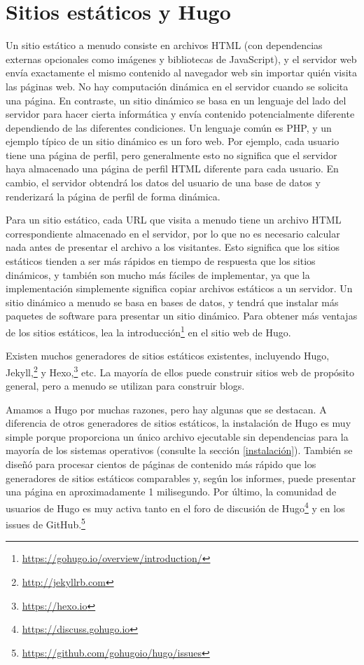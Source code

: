 \documentclass[12pt,]{krantz}
\renewcommand{\href}[2]{#2\footnote{\url{#1}}}
\theoremstyle{definition}
\theoremstyle{definition}
\theoremstyle{definition}
\theoremstyle{remark}
\begin{document}
\hypertarget{static-sites}{%
\section{Sitios estáticos y Hugo}\label{static-sites}}

Un sitio estático a menudo consiste en archivos
HTML (con dependencias externas opcionales como imágenes y bibliotecas
de JavaScript), y el servidor web envía exactamente el mismo contenido
al navegador web sin importar quién visita las páginas web. No hay
computación dinámica en el servidor cuando se solicita una página. En
contraste, un sitio dinámico se basa en un lenguaje del lado del
servidor para hacer cierta informática y envía contenido potencialmente
diferente dependiendo de las diferentes condiciones. Un lenguaje común
es PHP, y un ejemplo típico de un sitio dinámico es un foro web. Por
ejemplo, cada usuario tiene una página de perfil, pero generalmente esto
no significa que el servidor haya almacenado una página de perfil HTML
diferente para cada usuario. En cambio, el servidor obtendrá los datos
del usuario de una base de datos y renderizará la página de perfil de
forma dinámica.

Para un sitio estático, cada URL que visita a menudo tiene un archivo
HTML correspondiente almacenado en el servidor, por lo que no es
necesario calcular nada antes de presentar el archivo a los visitantes.
Esto significa que los sitios estáticos tienden a ser más rápidos en
tiempo de respuesta que los sitios dinámicos, y también son mucho más
fáciles de implementar, ya que la implementación simplemente significa
copiar archivos estáticos a un servidor. Un sitio dinámico a menudo se
basa en bases de datos, y tendrá que instalar más paquetes de software
para presentar un sitio dinámico. Para obtener más ventajas de los
sitios estáticos, lea la
\href{https://gohugo.io/overview/introduction/}{introducción} en el
sitio web de Hugo.

Existen muchos generadores de sitios estáticos existentes, incluyendo
Hugo, \href{http://jekyllrb.com}{Jekyll,} y
\href{https://hexo.io}{Hexo,} etc. La mayoría de ellos puede construir
sitios web de propósito general, pero a menudo se utilizan para
construir blogs.

Amamos a Hugo por muchas razones, pero hay algunas que se destacan. A
diferencia de otros generadores de sitios estáticos, la instalación de
Hugo es muy simple porque proporciona un único archivo ejecutable sin
dependencias para la mayoría de los sistemas operativos (consulte la
sección \ref{instalación}). También se diseñó para procesar cientos de
páginas de contenido más rápido que los generadores de sitios estáticos
comparables y, según los informes, puede presentar una página en
aproximadamente 1 milisegundo. Por último, la comunidad de usuarios de
Hugo es muy activa tanto en el \href{https://discuss.gohugo.io}{foro de
discusión de Hugo} y en los
\href{https://github.com/gohugoio/hugo/issues}{issues de GitHub.}
\end{document}
